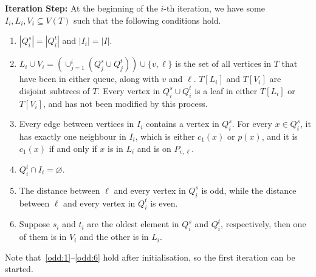 \documentclass[11pt]{article}
\theoremstyle{definition}
\newcounter{propcounter}
\begin{document}
\noindent\textbf{Iteration Step:}
At the beginning of the $i$-th iteration, we have some $I_i,L_i,V_i\subseteq V(T)$ such that the following conditions hold. 
\begin{enumerate}[label = \textbf{\Alph{propcounter}\arabic{enumi}}]
    \item\label{odd:1} $|Q_i^s|=|Q_i^t|$ and $|I_{i}|=|I|$.
    \item\label{odd:2} $L_i\cup V_i=(\cup_{j=1}^i(Q_j^s\cup Q_j^t))\cup\{v,\ell\}$ is the set of all vertices in $T$ that have been in either queue, along with $v$ and $\ell$. $T[L_i]$ and $T[V_i]$ are disjoint subtrees of $T$. Every vertex in $Q_i^s\cup Q_i^t$ is a leaf in either $T[L_i]$ or $T[V_i]$, and has not been modified by this process.
    \item\label{odd:3} Every edge between vertices in $I_i$ contains a vertex in $Q_i^s$. For every $x\in Q_i^s$, it has exactly one neighbour in $I_i$, which is either $c_1(x)$ or $p(x)$, and it is $c_1(x)$ if and only if $x$ is in $L_i$ and is on $P_{v,\ell}$.
    \item\label{odd:4} $Q_i^t\cap I_i=\varnothing$. %
    \item\label{odd:5} The distance between $\ell$ and every vertex in $Q_i^s$ is odd, while the distance between $\ell$ and every vertex in $Q_i^t$ is even. 
    \item\label{odd:6} Suppose $s_i$ and $t_i$ are the oldest element in $Q_i^s$ and $Q_i^t$, respectively, then one of them is in $V_i$ and the other is in $L_i$.%
\end{enumerate} 
Note that~\ref{odd:1}--\ref{odd:6} hold after initialisation, so the first iteration can be started.
\end{document}
